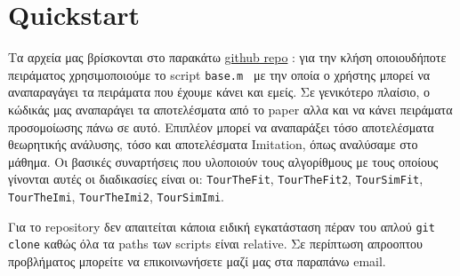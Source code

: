 \chapter{Quickstart}
Τα αρχεία μας βρίσκονται στο παρακάτω \href{https://github.com/vasilomanitaros/EvolutionaryGamesToolbox}{github repo} : για την κλήση οποιουδήποτε πειράματος χρησιμοποιούμε το script \texttt{base.m } με την οποία ο χρήστης μπορεί να αναπαραγάγει τα πειράματα που έχουμε κάνει και εμείς. Σε γενικότερο πλαίσιο, ο κώδικάς μας αναπαράγει τα αποτελέσματα από το paper\cite{paper}
αλλα και να κάνει πειράματα προσομοίωσης πάνω σε αυτό. Επιπλέον μπορεί να αναπαράξει τόσο αποτελέσματα θεωρητικής ανάλυσης, τόσο και αποτελέσματα Imitation, όπως αναλύσαμε στο μάθημα. Οι βασικές συναρτήσεις που υλοποιούν τους αλγορίθμους με τους οποίους γίνονται αυτές οι διαδικασίες είναι οι: \texttt{TourTheFit}, \texttt{TourTheFit2}, \texttt{TourSimFit}, \texttt{TourTheImi}, \texttt{TourTheImi2},
\texttt{TourSimImi}. 
\par 
Για το repository δεν απαιτείται κάποια ειδική εγκατάσταση πέραν του απλού \texttt{git clone} καθώς όλα τα paths των scripts είναι relative. Σε περίπτωση απροοπτου προβλήματος μπορείτε να επικοινωνήσετε μαζί μας στα παραπάνω email.